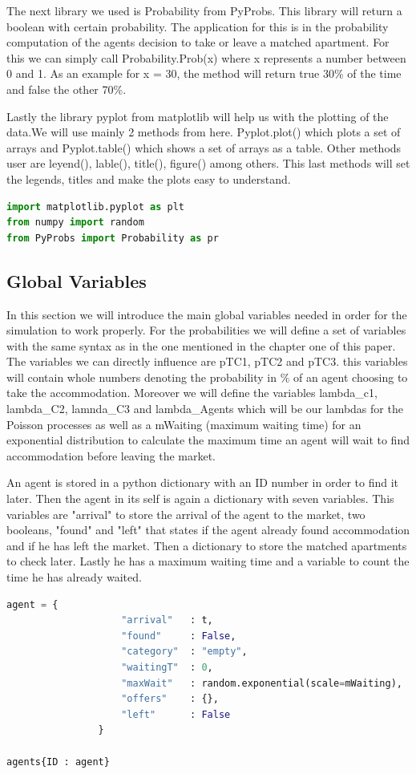 The next library we used is Probability from PyProbs. This library will return a boolean with certain probability. The application for this is in the probability computation of the agents decision to take or leave a matched apartment. For this we can simply call Probability.Prob(x) where x represents a number between 0 and 1. As an example for x = 30, the method will return true 30\% of the time and false the other 70\%.

Lastly the library pyplot from matplotlib will help us with the plotting of the data.We will use mainly 2 methods from here. Pyplot.plot() which plots a set of arrays and Pyplot.table() which shows a set of arrays as a table. Other methods user are leyend(), lable(), title(), figure() among others. This last methods will set the legends, titles and make the plots easy to understand.

\begin{lstlisting}[language=Python]
import matplotlib.pyplot as plt
from numpy import random
from PyProbs import Probability as pr
\end{lstlisting}

\subsection{Global Variables}

In this section we will introduce the main global variables needed in order for the simulation to work properly. For the probabilities we will define a set of variables with the same syntax as in the one mentioned in the chapter one of this paper. The variables we can directly influence are pTC1, pTC2 and pTC3. this variables will contain whole numbers denoting the probability in \% of an agent choosing to take the accommodation. Moreover we will define the variables lambda\_c1, lambda\_C2, lamnda\_C3 and lambda\_Agents which will be our lambdas for the Poisson processes as well as a mWaiting (maximum waiting time) for an exponential distribution to calculate the maximum time an agent will wait to find accommodation before leaving the market.



An agent is stored in a python dictionary with an ID number in order to find it later. Then the agent in its self is again a dictionary with seven variables. This variables are "arrival" to store the arrival of the agent to the market, two booleans, "found" and "left" that states if the agent already found accommodation and if he has left the market. Then a dictionary to store the matched apartments to check later. Lastly he has a maximum waiting time and a variable to count the time he has already waited.
\begin{lstlisting}[language=Python]
agent = {
                    "arrival"   : t,
                    "found"     : False,
                    "category"  : "empty",
                    "waitingT"  : 0,
                    "maxWait"   : random.exponential(scale=mWaiting),
                    "offers"    : {},
                    "left"      : False
                }
                
agents{ID : agent}
\end{lstlisting}

